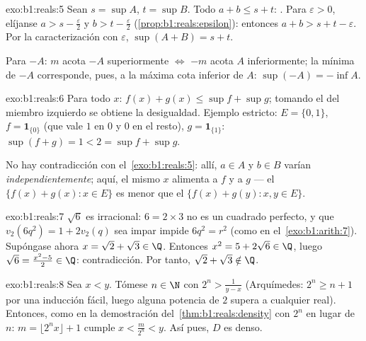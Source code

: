 \begin{solution}{exo:b1:reals:5}
Sean $s = \sup A$, $t = \sup B$. Todo $a + b \leq s + t$: . Para $\varepsilon > 0$, elíjanse $a > s - \frac\varepsilon2$
y $b > t - \frac\varepsilon2$ (\cref{prop:b1:reals:epsilon}): entonces
$a + b > s + t - \varepsilon$. Por la caracterización con
$\varepsilon$, $\sup(A+B) = s + t$.

Para $-A$: $m$ acota $-A$ superiormente $\iff$ $-m$ acota $A$
inferiormente; la mínima  de $-A$ corresponde, pues, a la
máxima cota inferior de $A$: $\sup(-A) = -\inf A$.
\end{solution}

\begin{solution}{exo:b1:reals:6}
Para todo $x$: $f(x) + g(x) \leq \sup f + \sup g$; tomando el 
del miembro izquierdo se obtiene la desigualdad. Ejemplo estricto:
$E = \{0, 1\}$, $f = \mathbf{1}_{\{0\}}$ (que vale $1$ en $0$ y $0$ en
el resto), $g = \mathbf{1}_{\{1\}}$: $\sup(f + g) = 1 < 2 = \sup f +
\sup g$.

No hay contradicción con el~\cref{exo:b1:reals:5}: allí, $a \in A$ y
$b \in B$ varían \emph{independientemente}; aquí, el mismo $x$
alimenta a $f$ y a $g$ --- el  $\{f(x) + g(x) : x \in E\}$ es
menor que el  $\{f(x) + g(y) : x, y \in E\}$.
\end{solution}

\begin{solution}{exo:b1:reals:7}
$\sqrt 6$ es irracional: $6 = 2 \times 3$ no es un cuadrado perfecto,
y que $v_2(6q^2) = 1 + 2v_2(q)$ sea impar impide $6q^2 = r^2$ (como en
el~\cref{exo:b1:arith:7}). Supóngase ahora $x = \sqrt 2 + \sqrt 3 \in
\Q$. Entonces $x^2 = 5 + 2\sqrt 6 \in \Q$, luego $\sqrt 6 =
\frac{x^2 - 5}{2} \in \Q$: contradicción. Por tanto,
$\sqrt 2 + \sqrt 3 \notin \Q$.
\end{solution}

\begin{solution}{exo:b1:reals:8}
Sea $x < y$. Tómese $n \in \N$ con $2^n > \frac{1}{y - x}$
(Arquímedes: $2^n \geq n + 1$ por una inducción fácil, luego alguna
potencia de $2$ supera a cualquier real). Entonces, como en la
demostración del~\cref{thm:b1:reals:density} con $2^n$ en lugar de $n$:
$m = \lfloor 2^n x \rfloor + 1$ cumple $x < \frac{m}{2^n} < y$. Así
pues, $D$ es denso.
\end{solution}

